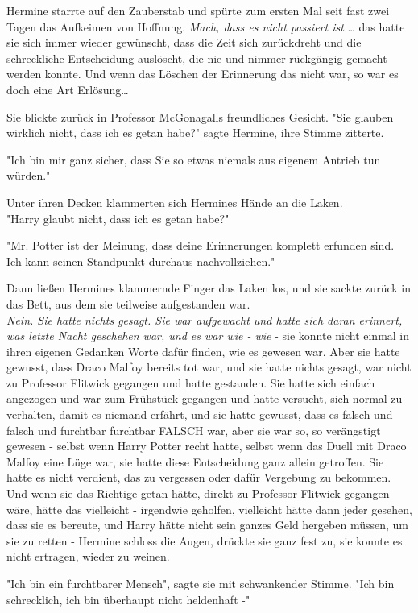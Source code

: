 {Hermine starrte auf den Zauberstab und spürte zum ersten Mal seit fast zwei Tagen das Aufkeimen von Hoffnung. \emph{Mach, dass es nicht passiert ist} … das hatte sie sich immer wieder gewünscht, dass die Zeit sich zurückdreht und die schreckliche Entscheidung auslöscht, die nie und nimmer rückgängig gemacht werden konnte. Und wenn das Löschen der Erinnerung das nicht war, so war es doch eine Art Erlösung…

Sie blickte zurück in Professor McGonagalls freundliches Gesicht. "Sie glauben wirklich nicht, dass ich es getan habe?" sagte Hermine, ihre Stimme zitterte.

"Ich bin mir ganz sicher, dass Sie so etwas niemals aus eigenem Antrieb tun würden."

Unter ihren Decken klammerten sich Hermines Hände an die Laken.\\ "Harry glaubt nicht, dass ich es getan habe?"

"Mr. Potter ist der Meinung, dass deine Erinnerungen komplett erfunden sind. Ich kann seinen Standpunkt durchaus nachvollziehen."

Dann ließen Hermines klammernde Finger das Laken los, und sie sackte zurück in das Bett, aus dem sie teilweise aufgestanden war.\\ \emph{Nein. Sie hatte nichts gesagt. Sie war aufgewacht und hatte sich daran erinnert, was letzte Nacht geschehen war, und es war wie - wie} - sie konnte nicht einmal in ihren eigenen Gedanken Worte dafür finden, wie es gewesen war. Aber sie hatte gewusst, dass Draco Malfoy bereits tot war, und sie hatte nichts gesagt, war nicht zu Professor Flitwick gegangen und hatte gestanden. Sie hatte sich einfach angezogen und war zum Frühstück gegangen und hatte versucht, sich normal zu verhalten, damit es niemand erfährt, und sie hatte gewusst, dass es falsch und falsch und furchtbar furchtbar FALSCH war, aber sie war so, so verängstigt gewesen - selbst wenn Harry Potter recht hatte, selbst wenn das Duell mit Draco Malfoy eine Lüge war, sie hatte diese Entscheidung ganz allein getroffen. Sie hatte es nicht verdient, das zu vergessen oder dafür Vergebung zu bekommen. Und wenn sie das Richtige getan hätte, direkt zu Professor Flitwick gegangen wäre, hätte das vielleicht - irgendwie geholfen, vielleicht hätte dann jeder gesehen, dass sie es bereute, und Harry hätte nicht sein ganzes Geld hergeben müssen, um sie zu retten - Hermine schloss die Augen, drückte sie ganz fest zu, sie konnte es nicht ertragen, wieder zu weinen.

"Ich bin ein furchtbarer Mensch", sagte sie mit schwankender Stimme. "Ich bin schrecklich, ich bin überhaupt nicht heldenhaft -"

}
